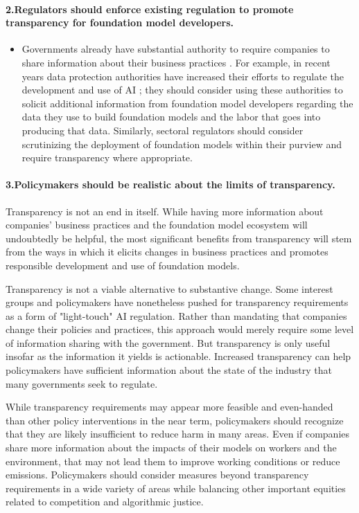 \paragraph{2.\phantom{X}Regulators should enforce existing regulation to promote transparency for foundation model developers.} 
    \begin{itemize}
        \item Governments already have substantial authority to require companies to share information about their business practices \cite{ho2012fudging, hess2019ttrap, irion2022algoff}.
        For example, in recent years data protection authorities have increased their efforts to regulate the development and use of AI \citep{zanfir-f2023fpf}; they should consider using these authorities to solicit additional information from foundation model developers regarding the data they use to build foundation models and the labor that goes into producing that data. 
        Similarly, sectoral regulators should consider scrutinizing the deployment of foundation models within their purview and require transparency where appropriate.
    \end{itemize}
 \paragraph{3.\phantom{X}Policymakers should be realistic about the limits of transparency.}
    \begin{myitemize}
        \item Transparency is not an end in itself. 
        While having more information about companies' business practices and the foundation model ecosystem will undoubtedly be helpful, the most significant benefits from transparency will stem from the ways in which it elicits changes in business practices and promotes responsible development and use of foundation models.
        \item Transparency is not a viable alternative to substantive change.
        Some interest groups and policymakers have nonetheless pushed for transparency requirements as a form of "light-touch" AI regulation.
        Rather than mandating that companies change their policies and practices, this approach would merely require some level of information sharing with the government.
        But transparency is only useful insofar as the information it yields is actionable.
        Increased transparency can help policymakers have sufficient information about the state of the industry that many governments seek to regulate.
        \item While transparency requirements may appear more feasible and even-handed than other policy interventions in the near term, policymakers should recognize that they are likely insufficient to reduce harm in many areas. 
        Even if companies share more information about the impacts of their models on workers and the environment, that may not lead them to improve working conditions or reduce emissions. 
        Policymakers should consider measures beyond transparency requirements in a wide variety of areas while balancing other important equities related to competition and algorithmic justice. 
    \end{myitemize}
